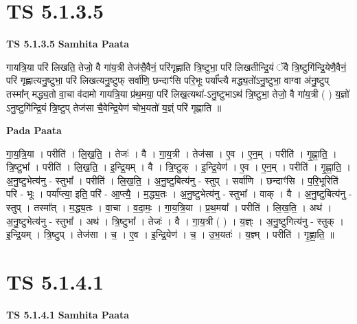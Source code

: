 \documentclass[17pt]{extarticle}
\begin{document}

\section{ TS 5.1.3.5 }

\textbf{TS 5.1.3.5 } \newline
\textbf{Samhita Paata} \newline

गायत्रि॒या परि॑ लिखति॒ तेजो॒ वै गा॑य॒त्री तेज॑सै॒वैनं॒ परि॑गृह्णाति त्रि॒ष्टुभा॒ परि॑ लिखतीन्द्रि॒यं ॅवै त्रि॒ष्टुगि॑न्द्रि॒येणै॒वैनं॒ परि॑ गृह्णात्यनु॒ष्टुभा॒ परि॑ लिखत्यनु॒ष्टुफ् सर्वा॑णि॒ छन्दाꣳ॑सि परि॒भूः पर्या᳚प्त्यै मद्ध्य॒तो॑ऽनु॒ष्टुभा॒ वाग्वा अ॑नु॒ष्टुप् तस्मा᳚न् मद्ध्य॒तो वा॒चा व॑दामो गायत्रि॒या प्र॑थ॒मया॒ परि॑ लिख॒त्यथा॑-ऽनु॒ष्टुभाऽथ॑ त्रि॒ष्टुभा॒ तेजो॒ वै गा॑य॒त्री ( ) य॒ज्ञो॑ ऽनु॒ष्टुगि॑न्द्रि॒यं त्रि॒ष्टुप् तेज॑सा चै॒वेन्द्रि॒येण॑ चोभ॒यतो॑ य॒ज्ञ्ं परि॑ गृह्णाति ॥ \newline

\textbf{Pada Paata} \newline

गा॒य॒त्रि॒या । परीति॑ । लि॒ख॒ति॒ । तेजः॑ । वै । गा॒य॒त्री । तेज॑सा । ए॒व । ए॒न॒म् । परीति॑ । गृ॒ह्णा॒ति॒ । त्रि॒ष्टुभा᳚ । परीति॑ । लि॒ख॒ति॒ । इ॒न्द्रि॒यम् । वै । त्रि॒ष्टुक् । इ॒न्द्रि॒येण॑ । ए॒व । ए॒न॒म् । परीति॑ । गृ॒ह्णा॒ति॒ । अ॒नु॒ष्टुभेत्य॑नु - स्तुभा᳚ । परीति॑ । लि॒ख॒ति॒ । अ॒नु॒ष्टुबित्य॑नु - स्तुप् । सर्वा॑णि । छन्दाꣳ॑सि । प॒रि॒भूरिति॑ परि - भूः । पर्या᳚प्त्या॒ इति॒ परि॑ - आ॒प्त्यै॒ । म॒द्ध्य॒तः । अ॒नु॒ष्टुभेत्य॑नु - स्तुभा᳚ । वाक् । वै । अ॒नु॒ष्टुबित्य॑नु - स्तुप् । तस्मा᳚त् । म॒द्ध्य॒तः । वा॒चा । व॒दा॒मः॒ । गा॒य॒त्रि॒या । प्र॒थ॒मया᳚ । परीति॑ । लि॒ख॒ति॒ । अथ॑ । अ॒नु॒ष्टुभेत्य॑नु - स्तुभा᳚ । अथ॑ । त्रि॒ष्टुभा᳚ । तेजः॑ । वै । गा॒य॒त्री ( ) । य॒ज्ञ्ः । अ॒नु॒ष्टुगित्य॑नु - स्तुक् । इ॒न्द्रि॒यम् । त्रि॒ष्टुप् । तेज॑सा । च॒ । ए॒व । इ॒न्द्रि॒येण॑ । च॒ । उ॒भ॒यतः॑ । य॒ज्ञ्म् । परीति॑ । गृ॒ह्णा॒ति॒ ॥  \newline





\section{ TS 5.1.4.1 }

\textbf{TS 5.1.4.1 } \newline
\textbf{Samhita Paata} \newline
\end{document}
